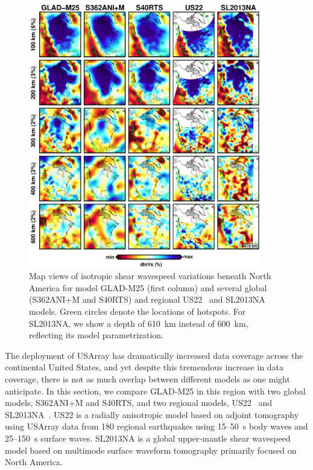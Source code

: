\begin{figure}
\centering
\includegraphics[width=0.9\textwidth]{ch-GLADM25/figures/depth_slice/america_vs.pdf}
  \caption[Map views of isotropic shear wavespeed variations beneath North America]
  {\small{Map views of isotropic shear wavespeed variations beneath North America 
  for model GLAD-M25 (first column) and several global (S362ANI$+$M and S40RTS)
  and regional US22~\cite{zhu2017radial} and SL2013NA~\cite{schaeffer2014imaging}
  models. Green circles denote the locations of hotspots. For SL2013NA, we
  show a depth of 610~km instead of 600~km, reflecting its model parametrization.}}
\label{fig:america-vs}
\end{figure}

The deployment of USArray has dramatically increased data coverage across the
continental United States,
and yet despite this tremendous increase in data coverage, there is not as much overlap between different models as one might anticipate.
In this section, we compare GLAD-M25 in this region 
with two global models, S362ANI$+$M and S40RTS, and two regional models,
US22~\cite{zhu2017radial} and SL2013NA~\cite{schaeffer2014imaging}.
US22 is a radially anisotropic model based on adjoint tomography using
USArray data from 180 regional earthquakes using 15--50~s
body waves and 25--150~s surface waves.
SL2013NA is a global upper-mantle shear wavespeed model based on multimode
surface waveform tomography primarily focused on North America.


